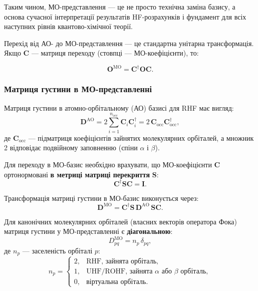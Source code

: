 Таким чином, МО-представлення — це не просто технічна заміна базису, а основа сучасної інтерпретації результатів HF-розрахунків і фундамент для всіх наступних рівнів квантово-хімічної теорії.

\begin{commentbox}
Перехід від АО- до МО-представлення — це стандартна унітарна трансформація.
Якщо $\mathbf{C}$ --- матриця переходу (стовпці --- МО-коефіцієнти), то:

\begin{equation*}
  \mathbf{O}^{\text{MO}} = \mathbf{C}^\dagger \mathbf{O} \mathbf{C}.
\end{equation*}
\end{commentbox}

\subsubsection{Матриця густини в МО-представленні}

Матриця густини в атомно-орбітальному (АО) базисі для RHF має вигляд:
\begin{equation}
    \mathbf{D}^{\text{AO}} = 2 \sum_{i=1}^{n_{\text{occ}}} \mathbf{C}_i \mathbf{C}_i^\dagger
    = 2 \, \mathbf{C}_{\text{occ}} \mathbf{C}_{\text{occ}}^\dagger,
\end{equation}
де $\mathbf{C}_{\text{occ}}$ — підматриця коефіцієнтів зайнятих молекулярних орбіталей,
а множник 2 відповідає подвійному заповненню (спіни $\alpha$ і $\beta$).

Для переходу в МО-базис необхідно врахувати, що МО-коефіцієнти $\mathbf{C}$
ортонормовані \textbf{в метриці матриці перекриття} $\mathbf{S}$:
\begin{equation}
    \mathbf{C}^\dagger \mathbf{S} \mathbf{C} = \mathbf{I}.
\end{equation}

Трансформація матриці густини в МО-базис виконується через:
\begin{equation}\label{eq:D_MO_transform}
    \mathbf{D}^{\text{MO}} = \mathbf{C}^\dagger \mathbf{S} \, \mathbf{D}^{\text{AO}} \, \mathbf{S} \mathbf{C}.
\end{equation}

Для канонічних молекулярних орбіталей (власних векторів оператора Фока)
матриця густини у МО-представленні є \textbf{діагональною}:
\begin{equation}\label{eq:D_MO_diagonal}
    D_{pq}^{\mathrm{MO}} = n_p\,\delta_{pq},
\end{equation}
де $n_p$ --- заселеність орбіталі $p$:
\begin{equation}
    n_p =
    \begin{cases}
        2, & \text{RHF, зайнята орбіталь},\\[4pt]
        1, & \text{UHF/ROHF, зайнята $\alpha$ або $\beta$ орбіталь},\\[4pt]
        0, & \text{віртуальна орбіталь}.
    \end{cases}
\end{equation}

